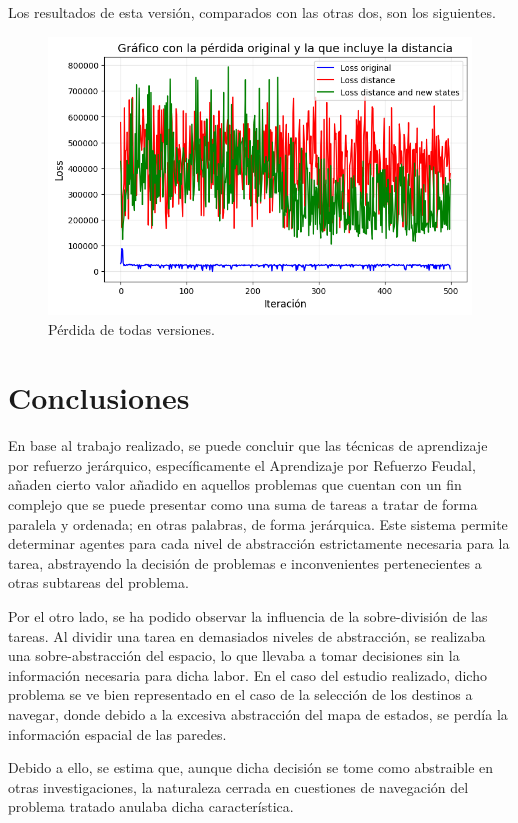\documentclass[letterpaper]{article} %
\begin{document}
Los resultados de esta versión, comparados con las otras dos, son los siguientes.
\begin{figure}[H]
    \centering
    \includegraphics[width=0.9\columnwidth]{FuN_3.png}
    \caption{Pérdida de todas versiones.\label{fig:FuN5}}
\end{figure}

\section{Conclusiones}
En base al trabajo realizado, se puede concluir que las técnicas de aprendizaje por refuerzo jerárquico, específicamente el Aprendizaje por Refuerzo Feudal, añaden cierto valor añadido en aquellos problemas que cuentan con un fin complejo que se puede presentar como una suma de tareas a tratar de forma paralela y ordenada; en otras palabras, de forma jerárquica. Este sistema permite determinar agentes para cada nivel de abstracción estrictamente necesaria para la tarea, abstrayendo la decisión de problemas e inconvenientes pertenecientes a otras subtareas del problema.

Por el otro lado, se ha podido observar la influencia de la sobre-división de las tareas. Al dividir una tarea en demasiados niveles de abstracción, se realizaba una sobre-abstracción del espacio, lo que llevaba a tomar decisiones sin la información necesaria para dicha labor. En el caso del estudio realizado, dicho problema se ve bien representado en el caso de la selección de los destinos a navegar, donde debido a la excesiva abstracción del mapa de estados, se perdía la información espacial de las paredes. 

Debido a ello, se estima que, aunque dicha decisión se tome como abstraible en otras investigaciones, la naturaleza cerrada en cuestiones de navegación del problema tratado anulaba dicha característica.



\end{document}
